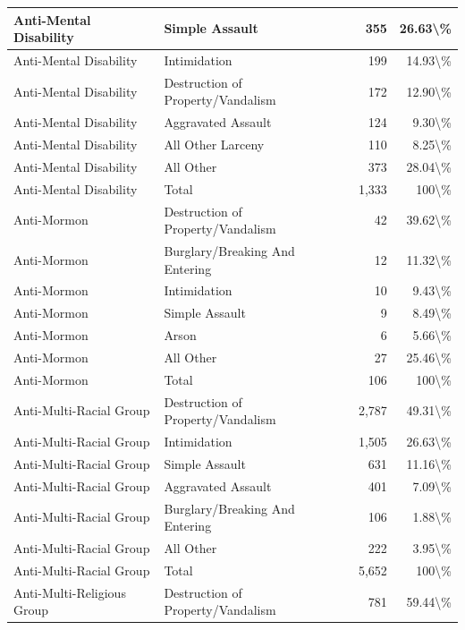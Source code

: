 \documentclass[
]{krantz}
\begin{document}
\begin{longtable}[t]{l|l|r|r}
Anti-Mental Disability & Simple Assault & 355 & 26.63\textbackslash{}\%\\
\hline
Anti-Mental Disability & Intimidation & 199 & 14.93\textbackslash{}\%\\
\hline
Anti-Mental Disability & Destruction of Property/Vandalism & 172 & 12.90\textbackslash{}\%\\
\hline
Anti-Mental Disability & Aggravated Assault & 124 & 9.30\textbackslash{}\%\\
\hline
Anti-Mental Disability & All Other Larceny & 110 & 8.25\textbackslash{}\%\\
\hline
Anti-Mental Disability & All Other & 373 & 28.04\textbackslash{}\%\\
\hline
Anti-Mental Disability & Total & 1,333 & 100\textbackslash{}\%\\
\hline
Anti-Mormon & Destruction of Property/Vandalism & 42 & 39.62\textbackslash{}\%\\
\hline
Anti-Mormon & Burglary/Breaking And Entering & 12 & 11.32\textbackslash{}\%\\
\hline
Anti-Mormon & Intimidation & 10 & 9.43\textbackslash{}\%\\
\hline
Anti-Mormon & Simple Assault & 9 & 8.49\textbackslash{}\%\\
\hline
Anti-Mormon & Arson & 6 & 5.66\textbackslash{}\%\\
\hline
Anti-Mormon & All Other & 27 & 25.46\textbackslash{}\%\\
\hline
Anti-Mormon & Total & 106 & 100\textbackslash{}\%\\
\hline
Anti-Multi-Racial Group & Destruction of Property/Vandalism & 2,787 & 49.31\textbackslash{}\%\\
\hline
Anti-Multi-Racial Group & Intimidation & 1,505 & 26.63\textbackslash{}\%\\
\hline
Anti-Multi-Racial Group & Simple Assault & 631 & 11.16\textbackslash{}\%\\
\hline
Anti-Multi-Racial Group & Aggravated Assault & 401 & 7.09\textbackslash{}\%\\
\hline
Anti-Multi-Racial Group & Burglary/Breaking And Entering & 106 & 1.88\textbackslash{}\%\\
\hline
Anti-Multi-Racial Group & All Other & 222 & 3.95\textbackslash{}\%\\
\hline
Anti-Multi-Racial Group & Total & 5,652 & 100\textbackslash{}\%\\
\hline
Anti-Multi-Religious Group & Destruction of Property/Vandalism & 781 & 59.44\textbackslash{}\%\\

\end{longtable}
\end{document}
